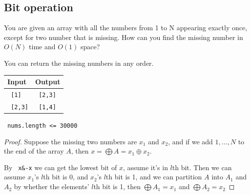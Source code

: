 \documentclass[11pt]{article}
\let\OldTexttt\texttt
\renewcommand{\texttt}[1]{\OldTexttt{\color{MidnightBlue} #1}}
\begin{document}
\subsection{Bit operation}
\label{sec:org9fb1492}
\begin{problem}
You are given an array with all the numbers from 1 to N appearing exactly once, except for two
number that is missing. How can you find the missing number in \(O(N)\) time and \(O(1)\) space?

You can return the missing numbers in any order.

\begin{center}
\begin{tabular}{ll}
Input & Output\\
\hline
\texttt{[1]} & \texttt{[2,3]}\\
\texttt{[2,3]} & \texttt{[1,4]}\\
\end{tabular}
\end{center}


\texttt{nums.length <= 30000}
\end{problem}

\begin{proof}
Suppose the missing two numbers are \(x_1\) and \(x_2\), and if we add \(1,\dots,N\) to the end of the
array \(A\), then \(x=\bigoplus A=x_1\oplus x_2\).

By \texttt{x\&-x} we can get the lowest bit of \(x\), assume it's in \(l\)th bit. Then we can
assume \(x_1\)'s \(l\)th bit is 0, and \(x_2\)'s \(l\)th bit is 1, and we can partition \(A\) into
\(A_1\) and \(A_2\) by whether the elements' \(l\)th bit is 1, then \(\bigoplus A_1=x_1\) and \(\bigoplus A_2=x_2\)
\end{proof}
\end{document}
